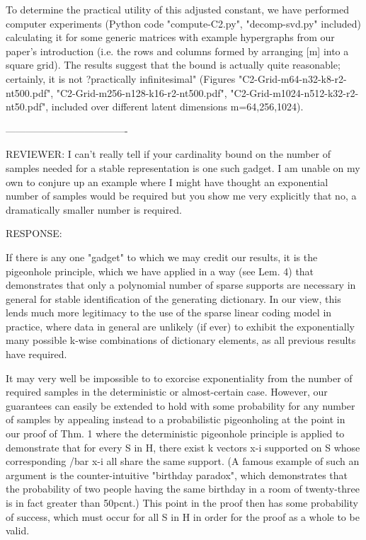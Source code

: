 To determine the practical utility of this adjusted constant, we have performed computer experiments (Python code "compute-C2.py", "decomp-svd.py" included) calculating it for some generic matrices with example hypergraphs from our paper's introduction (i.e. the rows and columns formed by arranging [m] into a square grid). The results suggest that the bound is actually quite reasonable; certainly, it is not ?practically infinitesimal" (Figures "C2-Grid-m64-n32-k8-r2-nt500.pdf", "C2-Grid-m256-n128-k16-r2-nt500.pdf", "C2-Grid-m1024-n512-k32-r2-nt50.pdf", included over different latent dimensions m=64,256,1024).

-------------------------------------

REVIEWER: I can't really tell if your cardinality bound on the number of samples
needed for a stable representation is one such gadget. I am unable on my
own to conjure up an example where I might have thought an exponential
number of samples would be required but you show me very explicitly that
no, a dramatically smaller number is required.


RESPONSE:

If there is any one "gadget" to which we may credit our results, it is the pigeonhole principle, which we have applied in a way (see Lem. 4) that demonstrates that only a polynomial number of sparse supports are necessary in general for stable identification of the generating dictionary. In our view, this lends much more legitimacy to the use of the sparse linear coding model in practice, where data in general are unlikely (if ever) to exhibit the exponentially many possible k-wise combinations of dictionary elements, as all previous results have required.

It may very well be impossible to to exorcise exponentiality from the number of required samples in the deterministic or almost-certain case. However, our guarantees can easily be extended to hold with some probability for any number of samples by appealing instead to a probabilistic pigeonholing at the point in our proof of Thm. 1 where the deterministic pigeonhole principle is applied to demonstrate that for every S in H, there exist k vectors x-i supported on S whose corresponding /bar x-i all share the same support. (A famous example of such an argument is the counter-intuitive "birthday paradox", which demonstrates that the probability of two people having the same birthday in a room of twenty-three is in fact greater than 50pcnt.) This point in the proof then has some probability of success, which must occur for all S in H in order for the proof as a whole to be valid.


